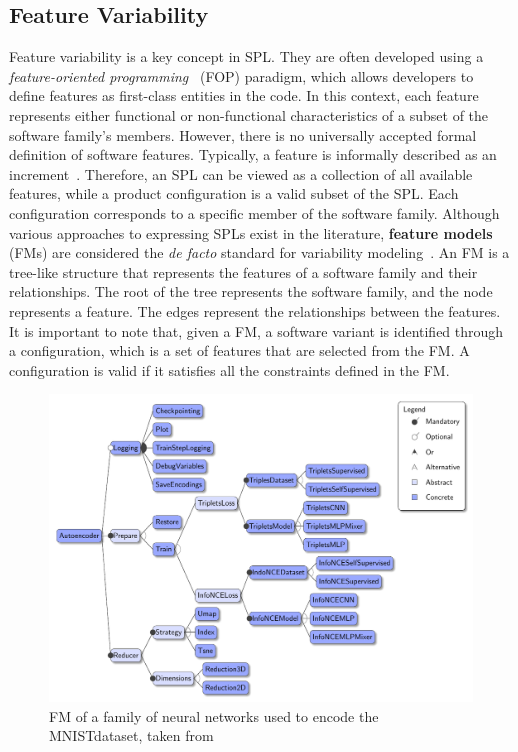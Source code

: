 \subsection{Feature Variability}\label{subsec:background:FeatureVariabilityInSPL}

Feature variability is a key concept in SPL. They are often developed using a \textit{feature-oriented programming}~\cite{Prehofer97} (FOP) paradigm, which allows developers to define features as first-class entities in the code. In this context, each feature represents either functional or non-functional characteristics of a subset of the software family's members. However, there is no universally accepted formal definition of software features. Typically, a feature is informally described as an increment~\cite{Batory21}. Therefore, an SPL can be viewed as a collection of all available features, while a product configuration is a valid subset of the SPL. Each configuration corresponds to a specific member of the software family. Although various approaches to expressing SPLs exist in the literature, \textbf{feature models}~\cite{Kang90} (FMs) are considered the \textit{de facto} standard for variability modeling~\cite{Czarnecki12}.
An FM is a tree-like structure that represents the features of a software family and their relationships. The root of the tree represents the software family, and the node represents a feature. The edges represent the relationships between the features.
It is important to note that, given a FM, a software variant is identified through a configuration, which is a set of features that are selected from the FM. A configuration is valid if it satisfies all the constraints defined in the FM.

\begin{figure}[t]
    \centering
    \includegraphics[width=0.9\linewidth]{figs/background/mnist_featuremodel.pdf}
    \caption{FM of a family of neural networks used to encode the MNIST\footnotemark dataset, taken from \cite{Cazzola22c}}
    \label{lst:background:featuremodel}
\end{figure}

